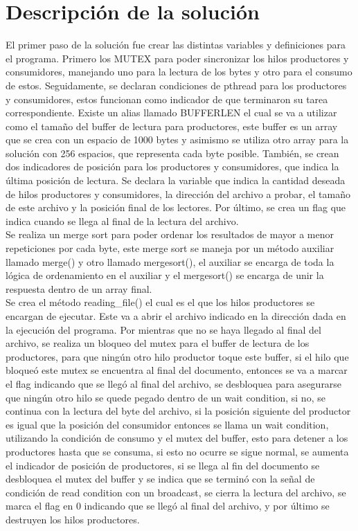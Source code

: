 \documentclass[12pt, article, natbib]{IEEEtran}
\begin{document}
\section{Descripción de la solución}
El primer paso de la solución fue crear las distintas variables y definiciones para el programa. Primero los MUTEX para poder sincronizar los hilos productores y consumidores, manejando uno para la lectura de los bytes y otro para el consumo de estos.\cite{cppdev_2010_c} \cite{manrow_2011_c} Seguidamente, se declaran condiciones de pthread para los productores y consumidores, estos funcionan como indicador de que terminaron su tarea correspondiente.\cite{theopengroup_1997_pthread_cond_wait} Existe un alias llamado BUFFERLEN el cual se va a utilizar como el tamaño del buffer de lectura para productores, este buffer es un array que se crea con un espacio de 1000 bytes y asimismo se utiliza otro array para la solución con 256 espacios, que representa cada byte posible. También, se crean dos indicadores de posición para los productores y consumidores, que indica la última posición de lectura. Se declara la variable que indica la cantidad deseada de hilos productores y consumidores, la dirección del archivo a probar, el tamaño de este archivo y la posición final de los lectores. Por último, se crea un flag que indica cuando se llega al final de la lectura del archivo.\\

Se realiza un merge sort para poder ordenar los resultados de mayor a menor repeticiones por cada byte, este merge sort se maneja por un método auxiliar llamado merge() y otro llamado mergesort(), el auxiliar se encarga de toda la lógica de ordenamiento en el auxiliar y el mergesort() se encarga de unir la respuesta dentro de un array final.\\

Se crea el método reading\_file() el cual es el que los hilos productores se encargan de ejecutar. Este va a abrir el archivo indicado en la dirección dada en la ejecución del programa.\cite{chanilastnam_2015_c} \cite{cppreferencecom_2021_fread} \cite{kerrisk_2010_fseek3} Por mientras que no se haya llegado al final del archivo, se realiza un bloqueo del mutex para el buffer de lectura de los productores, para que ningún otro hilo productor toque este buffer, si el hilo que bloqueó este mutex se encuentra al final del documento, entonces se va a marcar el flag indicando que se llegó al final del archivo, se desbloquea para asegurarse que ningún otro hilo se quede pegado dentro de un wait condition, si no, se continua con la lectura del byte del archivo, si la posición siguiente del productor es igual que la posición del consumidor entonces se llama un wait condition, utilizando la condición de consumo y el mutex del buffer, esto para detener a los productores hasta que se consuma, si esto no ocurre se sigue normal, se aumenta el indicador de posición de productores, si se llega al fin del documento se desbloquea el mutex del buffer y se indica que se terminó con la señal de condición de read condition con un broadcast, se cierra la lectura del archivo, se marca el flag en 0 indicando que se llegó al final del archivo,  y por último se destruyen los hilos productores.\cite{kerrisk_2010_pthread_exit3} \\
\end{document}
